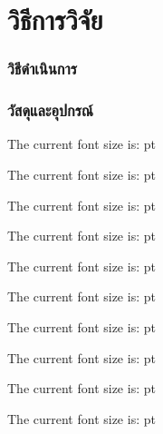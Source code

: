 \chapter{วิธีการวิจัย}
\subsection{วิธีดำเนินการ}
\subsection{วัสดุและอุปกรณ์}

\makeatletter
\newcommand\thefontsize[1]{{#1 The current font size is: \f@size pt\par}}
\makeatother

\sffamily 
\thefontsize\tiny
\thefontsize\scriptsize
\thefontsize\footnotesize
\thefontsize\small
\thefontsize\normalsize 
\thefontsize\large
\thefontsize\Large
\thefontsize\LARGE
\thefontsize\huge
\thefontsize\Huge